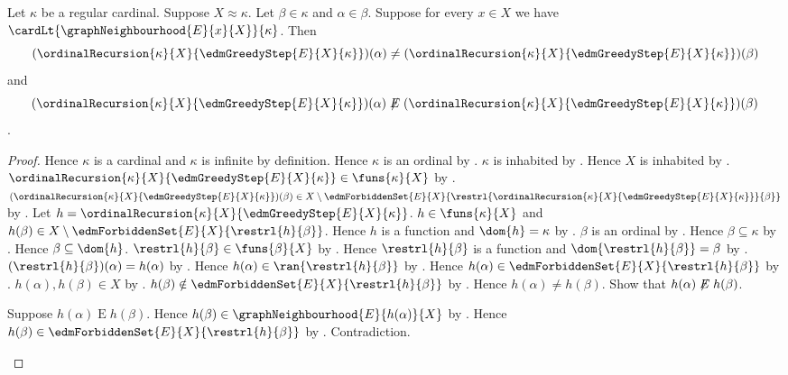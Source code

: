 \begin{theorem}\label{edm_greedy_later_separated}
    Let $\kappa$ be a regular cardinal.
    Suppose $X\approx\kappa$.
    Let $\beta\in\kappa$ and $\alpha\in\beta$.
    Suppose for every $x\in X$ we have
        $\cardLt{\graphNeighbourhood{E}{x}{X}}{\kappa}$.
    Then
    \[
        (\ordinalRecursion{\kappa}{X}
            {\edmGreedyStep{E}{X}{\kappa}})(\alpha)
        \neq
        (\ordinalRecursion{\kappa}{X}
            {\edmGreedyStep{E}{X}{\kappa}})(\beta)
    \]
    and
    \[
        (\ordinalRecursion{\kappa}{X}
            {\edmGreedyStep{E}{X}{\kappa}})(\alpha)
        \not\mathrel{E}
        (\ordinalRecursion{\kappa}{X}
            {\edmGreedyStep{E}{X}{\kappa}})(\beta)
    \].
\end{theorem}
\begin{proof}
    Hence $\kappa$ is a cardinal and $\kappa$ is infinite by definition.
    Hence $\kappa$ is an ordinal by .
    $\kappa$ is inhabited by .
    Hence $X$ is inhabited by .
    $\ordinalRecursion{\kappa}{X}{\edmGreedyStep{E}{X}{\kappa}}
        \in\funs{\kappa}{X}$ by
        .
    $(\ordinalRecursion{\kappa}{X}
            {\edmGreedyStep{E}{X}{\kappa}})(\beta)
        \in X\setminus\edmForbiddenSet{E}{X}
            {\restrl{\ordinalRecursion{\kappa}{X}
                {\edmGreedyStep{E}{X}{\kappa}}}{\beta}}$ by
        .
    Let $h=\ordinalRecursion{\kappa}{X}
        {\edmGreedyStep{E}{X}{\kappa}}$.
    $h\in\funs{\kappa}{X}$ and
        $h(\beta)\in X\setminus
            \edmForbiddenSet{E}{X}{\restrl{h}{\beta}}$.
    Hence $h$ is a function and $\dom{h}=\kappa$ by
        .
    $\beta$ is an ordinal by .
    Hence $\beta\subseteq\kappa$ by
        .
    Hence $\beta\subseteq\dom{h}$.
    $\restrl{h}{\beta}\in\funs{\beta}{X}$ by
        .
    Hence $\restrl{h}{\beta}$ is a function and
        $\dom{\restrl{h}{\beta}}=\beta$ by
        .
    $(\restrl{h}{\beta})(\alpha)=h(\alpha)$ by
        .
    Hence $h(\alpha)\in\ran{\restrl{h}{\beta}}$ by
        .
    Hence $h(\alpha)\in
        \edmForbiddenSet{E}{X}{\restrl{h}{\beta}}$ by
        .
    $h(\alpha),h(\beta)\in X$ by .
    $h(\beta)\notin
        \edmForbiddenSet{E}{X}{\restrl{h}{\beta}}$ by
        .
    Hence $h(\alpha)\neq h(\beta)$.
    Show that $h(\alpha)\not\mathrel{E}h(\beta)$.
    \begin{subproof}
        Suppose $h(\alpha)\mathrel{E}h(\beta)$.
        Hence $h(\beta)\in
            \graphNeighbourhood{E}{h(\alpha)}{X}$ by
            .
        Hence $h(\beta)\in
            \edmForbiddenSet{E}{X}{\restrl{h}{\beta}}$ by
            .
        Contradiction.
    \end{subproof}
\end{proof}

